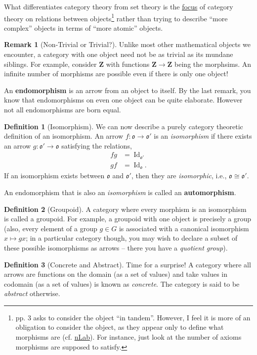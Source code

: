 \documentclass{scrbook}
\theoremstyle{definition}\newtheorem{defn}{Definition}
\theoremstyle{definition}\newtheorem*{rmk}{Remark}
\newcommand{\hi}[1]{{\color{blue}\textbf{#1}}}
\newcommand{\Z}{\mathbf{Z}}
\DeclareMathOperator{\Id}{Id}
\begin{document}
What differentiates category theory from set theory is the
\href{https://ncatlab.org/nlab/show/category+theory}{focus} of category theory
on relations between objects\footnote{\cite{riehl2017category} pp. 3 asks to
consider the object ``in tandem''. However, I feel it is more of an obligation
to consider the object, as they appear only to define what morphisms are (cf.
\href{https://ncatlab.org/nlab/show/category+theory}{nLab}). For instance, just
look at the number of axioms morphisms are supposed to satisfy.} rather than
trying to describe ``more complex'' objects in terms of ``more atomic'' objects.

\begin{rmk}[Non-Trivial or Trivial?]
  \label{s1}
  Unlike most other mathematical objects we encounter, a category with one
  object need not be as trivial as its mundane siblings. For example, consider
  $\Z$ with functions $\Z \to \Z$ being the morphsims. An infinite number of
  morphisms are possible even if there is only one object!
\end{rmk}

An \hi{endomorphism} is an arrow from an object to itself. By the last remark,
you know that endomorphisms on even one object can be quite
elaborate. However not all endomorphisms are born equal.

\begin{defn}[Isomorphism]
  We can now describe a purely category theoretic definition of an isomorphism.
  An arrow $f: \mathfrak o \to \mathfrak o'$ is an \emph{isomorphism} if there
  exists an arrow $g: \mathfrak o' \to \mathfrak o$ satisfying the relations,
  \begin{align*}
    fg &= \Id_{\mathfrak o'} \\
    gf &= \Id_{\mathfrak o}.
  \end{align*}
  If an isomorphism exists between $\mathfrak o$ and $\mathfrak o'$, then
  they are \emph{isomorphic}, i.e., $\mathfrak o \cong \mathfrak o'$.
\end{defn}

An endomorphism that is also an \emph{isomorphism} is called an \hi{automorphism}.

\begin{defn}[Groupoid]
  A category where every morphism is an isomorphism is called a groupoid.
  For example, a groupoid with one object is precisely a group (also, every
  element of a group $g \in G$ is associated with a canonical isomorphism
  $x \mapsto gx$; in a particular category though, you may wish to declare a
  subset of these possible isomorphisms as arrows -- there you have a
  \emph{quotient group}).
\end{defn}
\begin{defn}[Concrete and Abstract]
  \label{concreteandabstract}
  Time for a surprise! A category where all arrows are functions on the domain
  (as a set of values) and take values in codomain (as a set of values) is known
  as \emph{concrete}. The category is said to be \emph{abstract} otherwise.
\end{defn}
\end{document}
